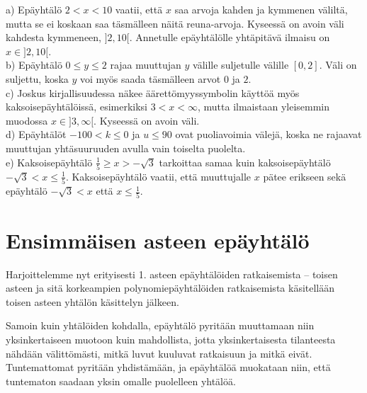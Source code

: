  \begin{esimerkki}
 
 a) Epäyhtälö $2<x<10$ vaatii, että $x$ saa arvoja kahden ja kymmenen väliltä, mutta se ei koskaan saa täsmälleen näitä reuna-arvoja. Kyseessä on avoin väli kahdesta kymmeneen, $]2,10[$. Annetulle epäyhtälölle yhtäpitävä ilmaisu on $x \in ]2,10[$. \\
 b) Epäyhtälö $0\leq y \leq 2$ rajaa muuttujan $y$ välille suljetulle välille $[0,2]$. Väli on suljettu, koska $y$ voi myös saada täsmälleen arvot $0$ ja $2$. \\
 c) Joskus kirjallisuudessa näkee äärettömyyssymbolin käyttöä myös kaksoisepäyhtälöissä, esimerkiksi $3<x<\infty $, mutta ilmaistaan yleisemmin muodossa $x \in ]3,\infty[$. Kyseessä on avoin väli. \\
 d) Epäyhtälöt $-100<k\leq 0$ ja $u\leq 90$ ovat puoliavoimia välejä, koska ne rajaavat muuttujan yhtäsuuruuden avulla vain toiselta puolelta. \\
 e) Kaksoisepäyhtälö $\frac{1}{5}\geq x>-\sqrt{3}$ tarkoittaa samaa kuin kaksoisepäyhtälö $-\sqrt{3}<x\leq \frac{1}{5}$. Kaksoisepäyhtälö vaatii, että muuttujalle $x$ pätee erikseen sekä epäyhtälö $-\sqrt{3}<x$ että $x\leq \frac{1}{5}$.
 \end{esimerkki}

\section{Ensimmäisen asteen epäyhtälö}


Harjoittelemme nyt erityisesti 1. asteen epäyhtälöiden ratkaisemista -- toisen asteen ja sitä korkeampien polynomiepäyhtälöiden ratkaisemista käsitellään toisen asteen yhtälön käsittelyn jälkeen.

Samoin kuin yhtälöiden kohdalla, epäyhtälö pyritään muuttamaan niin yksinkertaiseen muotoon kuin mahdollista, jotta yksinkertaisesta tilanteesta nähdään välittömästi, mitkä luvut kuuluvat ratkaisuun ja mitkä eivät. Tuntemattomat pyritään yhdistämään, ja epäyhtälöä muokataan niin, että tuntematon saadaan yksin omalle puolelleen yhtälöä.



